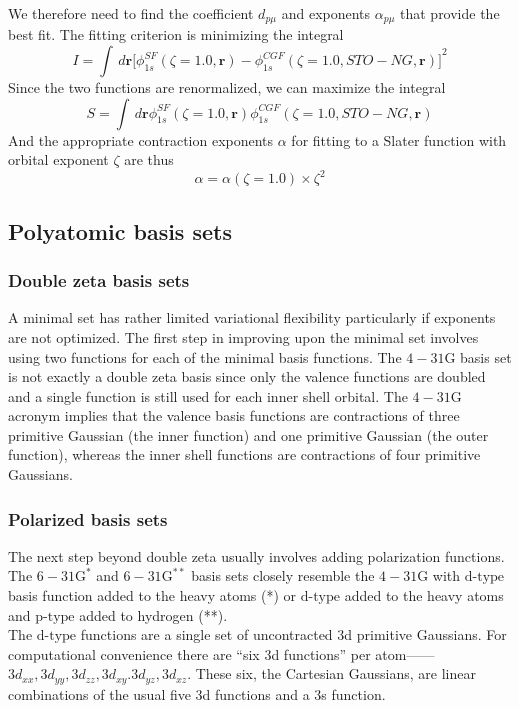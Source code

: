 \documentclass[11pt]{article}
\begin{document}
We therefore need to find the coefficient $d_{p\mu}$ and exponents $\alpha_{p\mu}$ that provide the best fit. The fitting criterion is minimizing
the integral
\begin{equation}
    I=\int\,d\mathbf{r}{\big[\phi_{1s}^{SF}(\zeta=1.0,\mathbf{r})-\phi_{1s}^{CGF}(\zeta=1.0,STO-NG,\mathbf{r})\big]}^2
\end{equation}
Since the two functions are renormalized, we can maximize the integral
\begin{equation}
    S=\int\,d\mathbf{r}\phi_{1s}^{SF}(\zeta=1.0,\mathbf{r})\phi_{1s}^{CGF}(\zeta=1.0,STO-NG,\mathbf{r})
\end{equation}
And the appropriate contraction exponents $\alpha$ for fitting to a Slater function with orbital exponent $\zeta$ are thus
\begin{equation}
    \alpha=\alpha(\zeta=1.0)\times\zeta^2
\end{equation}
\subsection{Polyatomic basis sets}
\subsubsection{Double zeta basis sets}
A minimal set has rather limited variational flexibility particularly if exponents are not optimized.
The first step in improving upon the minimal set involves using two functions for each of the minimal
basis functions. The $4-31$G basis set is not exactly a double zeta basis since only the valence functions
are doubled and a single function is still used for each inner shell orbital. The $4-31$G acronym implies
that the valence basis functions are contractions of three primitive Gaussian (the inner function) and one
primitive Gaussian (the outer function), whereas the inner shell functions are contractions of four primitive
Gaussians.
\subsubsection{Polarized basis sets}
The next step beyond double zeta usually involves adding polarization functions. The $6-31\text{G}^*$ and
$6-31\text{G}^{**}$ basis sets closely resemble the $4-31\text{G}$ with $\text{d-type}$ basis function added
to the heavy atoms (*) or $\text{d-type}$ added to the heavy atoms and $\text{p-type}$ added to hydrogen (**).\\
The $\text{d-type}$ functions are a single set of uncontracted 3d primitive Gaussians. For computational convenience 
there are ``six 3d functions'' per atom——$3d_{xx},3d_{yy},3d_{zz},3d_{xy}.3d_{yz},3d_{xz}$. These
six, the Cartesian Gaussians, are linear combinations of the usual five 3d functions and a 3s function.
\end{document}
